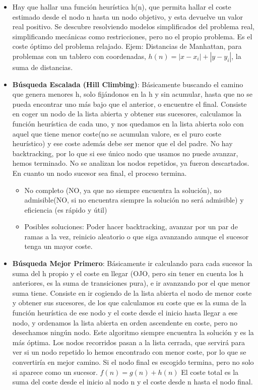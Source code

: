 \documentclass[12pt, twoside, openright]{report} %
\begin{document}
  \begin{itemize}
  \item Hay que hallar una función heurística h(n), que permita hallar el
    coste estimado desde el nodo n hasta un nodo objetivo, y esta
    devuelve un valor real positivo. Se descubre resolviendo modelos
    simplificados del problema real, simplificando mecánicas como
    restricciones, pero no el propio problema. Es el coste óptimo del
    problema relajado. Ejem: Distancias de Manhattan, para problemas con
    un tablero con coordenadas,
    $h(n)=| x-x_i|+| y-y_i|$, la suma de
    distancias.
    
  \item \textbf{Búsqueda Escalada (Hill Climbing)}: Básicamente buscando el
    camino que genera menores h, solo fijándonos en la h y sin acumular,
    hasta que no se pueda encontrar uno más bajo que el anterior, o
    encuentre el final. Consiste en coger un nodo de la lista abierta y
    obtener sus sucesores, calculamos la función heurística de cada uno,
    y nos quedamos en la lista abierta solo con aquel que tiene menor
    coste(no se acumulan valore, es el puro coste heurístico) y ese
    coste además debe ser menor que el del padre. No hay backtracking,
    por lo que si ese único nodo que usamos no puede avanzar, hemos
    terminado. No se analizan los nodos repetidos, ya fueron
    descartados. En cuanto un nodo sucesor sea final, el proceso
    termina.
    

    \begin{itemize}
    \item No completo (NO, ya que no siempre encuentra la solución), no
      admisible(NO, si no encuentra siempre la solución no será
      admisible) y eficiencia (es rápido y útil)
      
    \item Posibles soluciones: Poder hacer backtracking, avanzar por un par
      de ramas a la vez, reinicio aleatorio o que siga avanzando aunque
      el sucesor tenga un mayor coste.
      
    \end{itemize}
  \item \textbf{Búsqueda Mejor Primero}: Básicamente ir calculando para cada
    sucesor la suma del h propio y el coste en llegar (OJO, pero sin
    tener en cuenta los h anteriores, es la suma de transiciones pura),
    e ir avanzando por el que menor suma tiene. Consiste en ir cogiendo
    de la lista abierta el nodo de menor coste y obtener sus sucesores,
    de los que calculamos su coste que es la suma de la función
    heurística de ese nodo y el coste desde el inicio hasta llegar a ese
    nodo, y ordenamos la lista abierta en orden ascendente en coste,
    pero no desechamos ningún nodo. Este algoritmo siempre encuentra la
    solución y es la más óptima. Los nodos recorridos pasan a la lista
    cerrada, que servirá para ver si un nodo repetido lo hemos
    encontrado con menor coste, por lo que se convertiría en mejor
    camino. Si el nodo final es escogido termina, pero no solo si
    aparece como un sucesor. $f(n)=g(n)+h(n)$ El coste total es la suma
    del coste desde el inicio al nodo n y el coste desde n hasta el nodo
    final.
    


\end{itemize}
\end{document}
